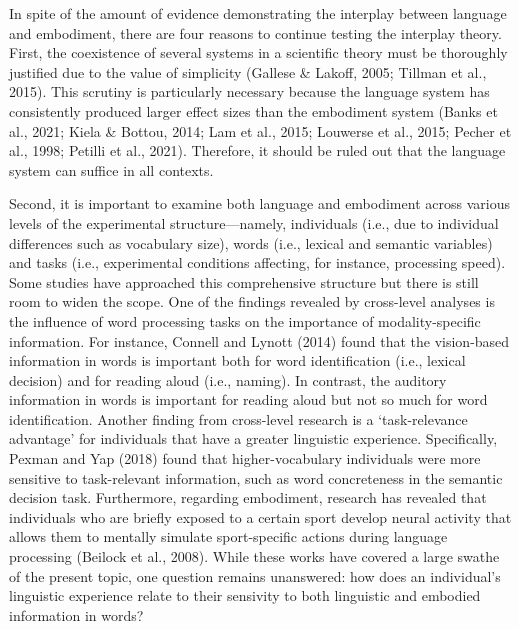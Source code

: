 \documentclass[
  12pt,
  man,floatsintext]{apa7}
\begin{document}
In spite of the amount of evidence demonstrating the interplay between language and embodiment, there are four reasons to continue testing the interplay theory. First, the coexistence of several systems in a scientific theory must be thoroughly justified due to the value of simplicity (Gallese \& Lakoff, 2005; Tillman et al., 2015). This scrutiny is particularly necessary because the language system has consistently produced larger effect sizes than the embodiment system (Banks et al., 2021; Kiela \& Bottou, 2014; Lam et al., 2015; Louwerse et al., 2015; Pecher et al., 1998; Petilli et al., 2021). Therefore, it should be ruled out that the language system can suffice in all contexts.

Second, it is important to examine both language and embodiment across various levels of the experimental structure---namely, individuals (i.e., due to individual differences such as vocabulary size), words (i.e., lexical and semantic variables) and tasks (i.e., experimental conditions affecting, for instance, processing speed). Some studies have approached this comprehensive structure but there is still room to widen the scope. One of the findings revealed by cross-level analyses is the influence of word processing tasks on the importance of modality-specific information. For instance, Connell and Lynott (2014) found that the vision-based information in words is important both for word identification (i.e., lexical decision) and for reading aloud (i.e., naming). In contrast, the auditory information in words is important for reading aloud but not so much for word identification. Another finding from cross-level research is a `task-relevance advantage' for individuals that have a greater linguistic experience. Specifically, Pexman and Yap (2018) found that higher-vocabulary individuals were more sensitive to task-relevant information, such as word concreteness in the semantic decision task. Furthermore, regarding embodiment, research has revealed that individuals who are briefly exposed to a certain sport develop neural activity that allows them to mentally simulate sport-specific actions during language processing (Beilock et al., 2008). While these works have covered a large swathe of the present topic, one question remains unanswered: how does an individual's linguistic experience relate to their sensivity to both linguistic and embodied information in words?
\end{document}
